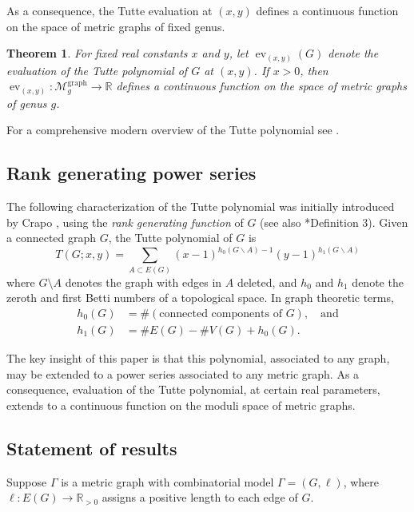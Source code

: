\documentclass{amsart}
\newtheorem{thm}{Theorem}
\theoremstyle{definition}
\newcommand{\RR}{\mathbb{R}}
\newcommand{\RRpos}{\RR_{>0}}
\DeclareMathOperator{\ev}{ev}
\newcommand{\Mgraphg}{\mathcal M_g^{\mathrm{graph}}}
\begin{document}
As a consequence, the Tutte evaluation at $(x, y)$ defines a continuous function on the space of metric graphs of fixed genus.
\begin{thm}
	For fixed real constants $x$ and $y$, let $\ev_{(x, y)}(G)$ denote the evaluation of the Tutte polynomial of $G$ at $(x, y)$.
	If $x > 0$, then $\ev_{(x, y)}: \Mgraphg \to \RR$ defines a continuous function on the space of metric graphs of genus $g$.
\end{thm}

For a comprehensive modern overview of the Tutte polynomial see \cites{BO, EMM}.

\subsection{Rank generating power series}
The following characterization of the Tutte polynomial was initially introduced by Crapo \cite{Cra}, 
using the  {\em rank generating function} of $G$
(see also \cite{EMM}*{Definition 3}).
Given a connected graph $G $, 
the Tutte polynomial of $G$ is 
\begin{equation}
\label{eq:tutte-graph}
T(G; x,y) = \sum_{A \subset E(G)} (x-1)^{h_0(G\backslash A) - 1}(y-1)^{h_1(G\backslash A)}
\end{equation}
where $G\setminus A$ denotes the graph with edges in $A$ deleted,
and $h_0$ and $h_1$ denote the zeroth and first Betti numbers of 
a topological space.
In graph theoretic terms,
\begin{align*}
h_0(G) &= \#(\text{connected components of }G), \quad\text{and}\\
h_1(G) &= \# E(G) - \# V(G) + h_0(G) .
\end{align*}

The key insight of this paper is that this polynomial, associated to any graph, may be extended to a power series associated to any metric graph.
As a consequence, evaluation of the Tutte polynomial, at certain real parameters, extends to a continuous function on the moduli space of metric graphs.

\subsection{Statement of results}
Suppose $\Gamma$ is a metric graph with combinatorial model $\Gamma = (G,\ell)$,
where $\ell : E(G) \to \RRpos$ assigns a positive length to each edge of $G$.
\end{document}
